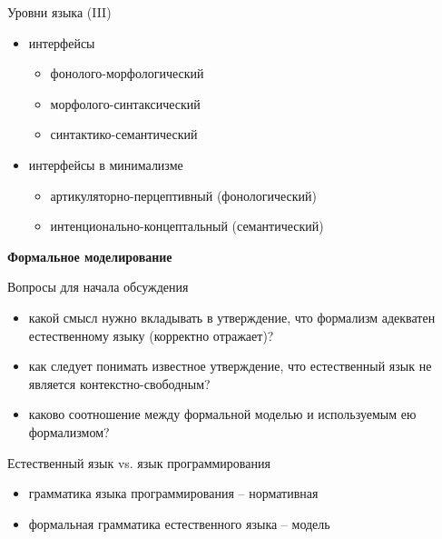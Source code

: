 \documentclass{beamer}
\begin{document}
\begin{frame}{Уровни языка (III)}
\begin{itemize}
	\item интерфейсы 
	    \begin{itemize}
	    	\item фонолого-морфологический
	    	\item морфолого-синтаксический
	    	\item синтактико-семантический
	    \end{itemize}
	\item интерфейсы в минимализме 
		\begin{itemize}
			\item артикуляторно-перцептивный (фонологический)
			\item интенционально-концептальный (семантический)
		\end{itemize}
\end{itemize}
\end{frame}



\begin{frame}{}
\begin{center}
	\textbf{Формальное моделирование}
\end{center}
\end{frame}

\begin{frame}{Вопросы для начала обсуждения}
\begin{itemize}
	\item какой смысл нужно вкладывать в утверждение, что формализм адекватен естественному языку (корректно отражает)?
	\item как следует понимать известное утверждение, что естественный язык не является контекстно-свободным?
	\item каково соотношение между формальной моделью и используемым ею формализмом?
\end{itemize}
\end{frame}

\begin{frame}{Естественный язык vs. язык программирования}
\begin{itemize}
	\item грамматика языка программирования -- нормативная
	\item формальная грамматика естественного языка -- модель
\end{itemize}
\end{frame}
\end{document}

